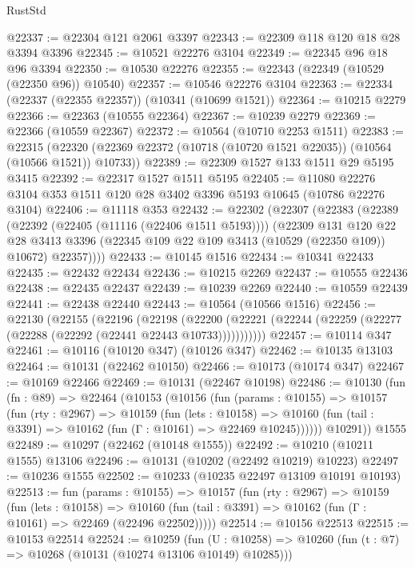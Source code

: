 \begin{lexlean}{RustStd}
\begin{coremodule}
@22337 := @22304 @121 @2061 @3397
@22343 := @22309 @118 @120 @18 @28 @3394 @3396
@22345 := @10521 @22276 @3104
@22349 := @22345 @96 @18 @96 @3394
@22350 := @10530 @22276
@22355 := @22343 (@22349 (@10529 (@22350 @96)) @10540)
@22357 := @10546 @22276 @3104
@22363 := @22334 (@22337 (@22355 @22357)) (@10341 (@10699 @1521))
@22364 := @10215 @2279
@22366 := @22363 (@10555 @22364)
@22367 := @10239 @2279
@22369 := @22366 (@10559 @22367)
@22372 := @10564 (@10710 @2253 @1511)
@22383 := @22315
    (@22320 (@22369 @22372 (@10718 (@10720 @1521 @22035)) (@10564 (@10566 @1521)) @10733))
@22389 := @22309 @1527 @133 @1511 @29 @5195 @3415
@22392 := @22317 @1527 @1511 @5195
@22405 := @11080 @22276 @3104 @353 @1511 @120 @28 @3402 @3396 @5193 @10645 (@10786 @22276 @3104)
@22406 := @11118 @353
@22432 := @22302
    (@22307
      (@22383
        (@22389
          (@22392 (@22405 (@11116 (@22406 @1511 @5193))))
          (@22309
            @131
            @120
            @22
            @28
            @3413
            @3396
            (@22345 @109 @22 @109 @3413 (@10529 (@22350 @109)) @10672)
            @22357))))
@22433 := @10145 @1516
@22434 := @10341 @22433
@22435 := @22432 @22434
@22436 := @10215 @2269
@22437 := @10555 @22436
@22438 := @22435 @22437
@22439 := @10239 @2269
@22440 := @10559 @22439
@22441 := @22438 @22440
@22443 := @10564 (@10566 @1516)
@22456 := @22130
    (@22155
      (@22196
        (@22198
          (@22200 (@22221 (@22244 (@22259 (@22277 (@22288 (@22292 (@22441 @22443 @10733)))))))))))
@22457 := @10114 @347
@22461 := @10116 (@10120 @347) (@10126 @347)
@22462 := @10135 @13103
@22464 := @10131 (@22462 @10150)
@22466 := @10173 (@10174 @347)
@22467 := @10169 @22466
@22469 := @10131 (@22467 @10198)
@22486 := @10130
    (fun (fn : @89) =>
    @22464
      (@10153
        (@10156
          (fun (params : @10155) =>
          @10157
            (fun (rty : @2967) =>
            @10159
              (fun (lets : @10158) =>
              @10160 (fun (tail : @3391) => @10162 (fun (Γ : @10161) => @22469 @10245))))))
        @10291))
    @1555
@22489 := @10297 (@22462 (@10148 @1555))
@22492 := @10210 (@10211 @1555) @13106
@22496 := @10131 (@10202 (@22492 @10219) @10223)
@22497 := @10236 @1555
@22502 := @10233 (@10235 @22497 @13109 @10191 @10193)
@22513 := fun (params : @10155) =>
  @10157
    (fun (rty : @2967) =>
    @10159
      (fun (lets : @10158) =>
      @10160 (fun (tail : @3391) => @10162 (fun (Γ : @10161) => @22469 (@22496 @22502)))))
@22514 := @10156 @22513
@22515 := @10153 @22514
@22524 := @10259
    (fun (U : @10258) => @10260 (fun (t : @7) => @10268 (@10131 (@10274 @13106 @10149) @10285)))

\end{coremodule}
\end{lexlean}
